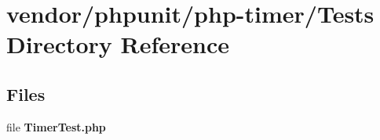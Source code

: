 \section{vendor/phpunit/php-\/timer/\+Tests Directory Reference}
\label{dir_fec5fe19cf68e166b2de8b829564d7de}
\subsection*{Files}
\begin{DoxyCompactItemize}
\item 
file {\bf Timer\+Test.\+php}
\end{DoxyCompactItemize}
